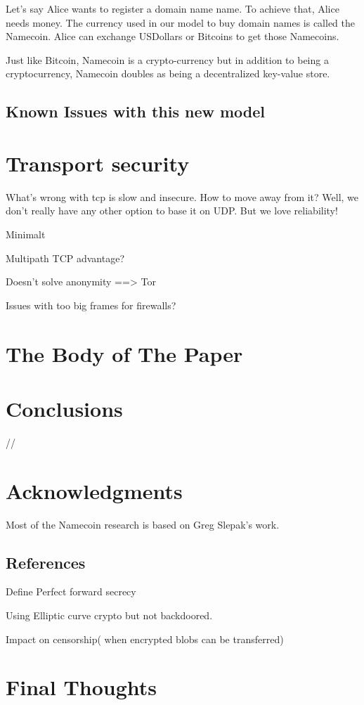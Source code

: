 \documentclass{vldb}
\begin{document}
Let's say Alice wants to register a domain name name. To achieve that, Alice needs money. The currency used in our model to buy domain names is called the Namecoin. Alice can exchange USDollars or Bitcoins to get those Namecoins. 

Just like Bitcoin, Namecoin is a crypto-currency but in addition to being a cryptocurrency, Namecoin doubles as being a decentralized key-value store.


\subsection{Known Issues with this new model}

\section{Transport security}
What's wrong with tcp is slow and insecure. How to move away from it? Well, we don't really have any other option to base it on UDP.
But we love reliability!

Minimalt  

Multipath TCP advantage?

Doesn't solve anonymity ==> Tor

Issues with too big frames for firewalls?
\section{The {\secit Body} of The Paper}


\section{Conclusions}

//\balance

\section{Acknowledgments}
Most of the Namecoin research is based on Greg Slepak's work.


\subsection{References}

\begin{appendix}
Define Perfect forward secrecy

Using Elliptic curve crypto but not backdoored.

Impact on censorship( when encrypted blobs can be transferred)
\section{Final Thoughts}

\end{appendix}
\end{document}
